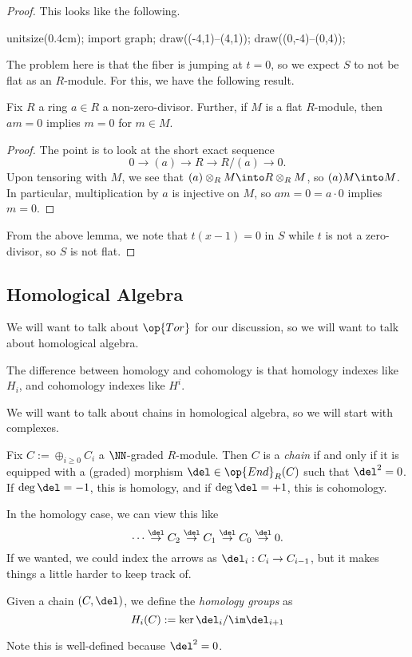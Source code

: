 \begin{proof}
	This looks like the following.
	\begin{center}
		\begin{asy}
			unitsize(0.4cm);
			import graph;
			draw((-4,1)--(4,1));
			draw((0,-4)--(0,4));
		\end{asy}
	\end{center}
	The problem here is that the fiber is jumping at $t=0$, so we expect $S$ to not be flat as an $R$-module. For this, we have the following result.
	\begin{lemma}
		Fix $R$ a ring $a\in R$ a non-zero-divisor. Further, if $M$ is a flat $R$-module, then $am=0$ implies $m=0$ for $m\in M$.
	\end{lemma}
	\begin{proof}
		The point is to look at the short exact sequence
		\[0\to(a)\to R\to R/(a)\to 0.\]
		Upon tensoring with $M$, we see that $(a)\otimes_RM\into R\otimes_RM$, so $(a)M\into M$. In particular, multiplication by $a$ is injective on $M$, so $am=0=a\cdot0$ implies $m=0$.
	\end{proof}
	From the above lemma, we note that $t(x-1)=0$ in $S$ while $t$ is not a zero-divisor, so $S$ is not flat.
\end{proof}

\subsection{Homological Algebra}
We will want to talk about $\op{Tor}$ for our discussion, so we will want to talk about homological algebra.
\begin{quot}
	The difference between homology and cohomology is that homology indexes like $H_i$, and cohomology indexes like $H^i$.
\end{quot}
We will want to talk about chains in homological algebra, so we will start with complexes.
\begin{definition}[Complex]
	Fix $C:=\oplus_{i\ge0}C_i$ a $\NN$-graded $R$-module. Then $C$ is a \textit{chain} if and only if it is equipped with a (graded) morphism $\del\in\op{End}_R(C)$ such that $\del^2=0$. If $\deg\del=-1$, this is homology, and if $\deg\del=+1$, this is cohomology.
\end{definition}
In the homology case, we can view this like
\[\cdots\stackrel\del\to C_2\stackrel\del\to C_1\stackrel\del\to C_0\stackrel\del\to 0.\]
If we wanted, we could index the arrows as $\del_i:C_i\to C_{i-1}$, but it makes things a little harder to keep track of.
\begin{definition}[Homology]
	Given a chain $(C,\del)$, we define the \textit{homology groups} as
	\[H_i(C):=\ker\del_i/\im\del_{i+1}\]
\end{definition}
Note this is well-defined because $\del^2=0$.

